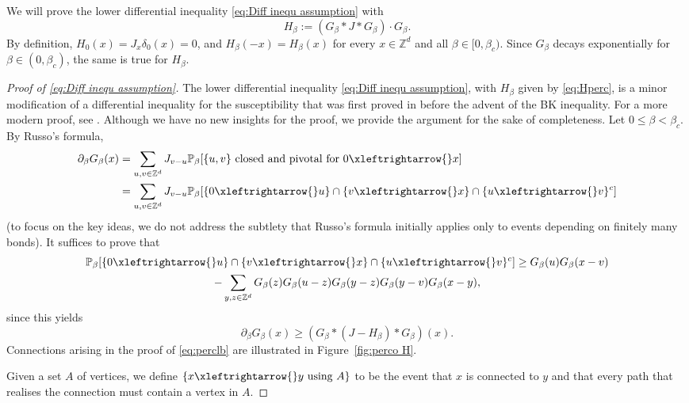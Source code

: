 \documentclass[11pt,a4paper]{article}
\numberwithin{equation}{section}
\theoremstyle{plain}
\theoremstyle{definition}
\newcommand\1{\mathds{1}}
\newcommand{\connect}{\xleftrightarrow}
\begin{document}
We will prove the lower differential inequality \eqref{eq:Diff inequ assumption} with
 \begin{equation}
 \label{eq:Hperc}
H_\beta:= (G_\beta*J*G_\beta)\cdot G_\beta .
 \end{equation}
By definition, $H_0(x)=J_x\delta_0(x)=0$, and $H_\beta(-x)=H_\beta(x)$ for every $x \in \mathbb Z^d$
and all $\beta\in [0,\beta_c)$.
Since $G_\beta$ decays exponentially for $\beta\in (0,\beta_c)$,
the same is true for $H_\beta$.



\begin{proof}[Proof of \eqref{eq:Diff inequ assumption}]
The lower differential inequality \eqref{eq:Diff inequ assumption}, with
$H_\beta$ given by \eqref{eq:Hperc},
is a minor modification of a differential inequality for the susceptibility
that was first proved in \cite{AN84} before the advent of the BK inequality.
For a more modern proof, see \cite[Proposition~9.11]{Slad06}.
Although we have no new insights for the proof, we provide the argument for the sake of completeness. Let $0\leq \beta<\beta_c$.
By Russo's formula,
\begin{align}
    \partial_\beta  G_\beta(x) &= \sum_{u,v\in \mathbb Z^d}J_{v-u} \mathbb P_{\beta} [\{u,v\} \text{ closed and pivotal for } 0 \connect{} x] \nonumber \\
    &= \sum_{u,v\in \mathbb Z^d}J_{v-u} \mathbb P_{\beta} [ \{0 \connect{} u\}\cap  \{v \connect{} x\}\cap  \{u \connect{} v\}^c]
\end{align}
(to focus on the key ideas, we do not address the subtlety that Russo's formula initially applies only to events depending on
finitely many bonds).
It suffices to prove that
    \begin{multline}
    \label{eq:perclb}
        \mathbb P_{\beta} [ \{0 \connect{} u\}\cap  \{v \connect{} x\}\cap  \{u \connect{} v\}^c] \geq G_\beta(u) G_\beta(x-v)
        \\- \sum_{y,z \in \mathbb Z^d} G_\beta(z)G_\beta(u-z) G_\beta(y-z) G_\beta(y-v) G_\beta(x-y),
    \end{multline}
since this yields
\begin{equation}
    \partial_\beta G_\beta(x)
    \ge
    (G_\beta*(J-H_\beta)* G_\beta)(x) .
\end{equation}
Connections arising in  the proof of \eqref{eq:perclb}
are illustrated in Figure~\ref{fig:perco H}.

Given a set $A$ of vertices, we define $\{x\connect{}y \textup{ using }A\}$ to be the event that $x$ is
connected to $y$ and that every path that realises the connection must contain a vertex
in $A$.


\end{proof}
\end{document}
